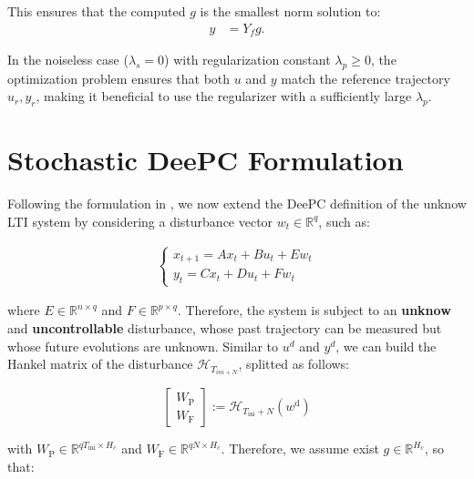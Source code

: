 \documentclass[12pt, a4paper]{article}
\begin{document}
This ensures that the computed \( g \) is the smallest norm solution to:
\begin{align}
    y &= Y_f g.
\end{align}

In the noiseless case (\( \lambda_s = 0 \)) with regularization constant \( \lambda_p \geq 0 \), the optimization problem ensures that both \( u \) and \( y \) match the reference trajectory \( u_r, y_r \), making it beneficial to use the regularizer with a sufficiently large \( \lambda_p \).

\section{Stochastic DeePC Formulation}
Following the formulation in \cite{huang2021decentralized}, we now extend the DeePC definition of the unknow LTI system by considering a disturbance vector $w_t \in \mathbb{R}^q$, such as: 

\begin{align}
    \begin{cases}
    x_{t+1} = Ax_t + Bu_t + Ew_t \\
    y_t = Cx_t + Du_t + Fw_t
    \end{cases}
\end{align}

where $E \in \mathbb{R}^{n \times q}$ and $F \in \mathbb{R}^{p \times q}$.
Therefore, the system is subject to an \textbf{unknow} and \textbf{uncontrollable} disturbance, whose past trajectory can be measured but whose future evolutions are unknown. Similar to $u^d$ and $y^d$, we can build the Hankel matrix of the disturbance $\mathcal{H}_{T_{ini + N}}$, splitted as follows: 

\begin{equation}
    \begin{bmatrix}
    W_\text{P} \\
    W_\text{F}
    \end{bmatrix} := \mathcal{H}_{T_\text{ini}+N}(w^\text{d})
    \tag{14}
    \end{equation}

\noindent with  $W_\text{P} \in \mathbb{R}^{qT_\text{ini} \times H_c}$ and $W_\text{F} \in \mathbb{R}^{qN \times H_c}$. Therefore, we assume exist $g \in \mathbb{R}^{H_c}$, so that: 
\end{document}
